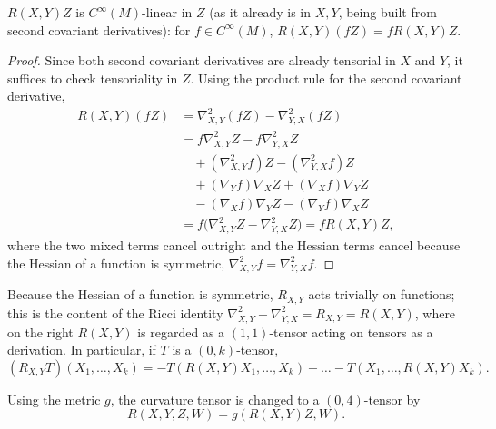 \begin{lemma}
  \label{lem:pet-ch3-curvature-tensor-tensorial}
  \leanok
  $R(X,Y)Z$ is $C^\infty(M)$-linear in $Z$ (as it already is in $X,Y$, being built
  from second covariant derivatives): for $f\in C^\infty(M)$,
  $R(X,Y)(fZ)=fR(X,Y)Z$.
\end{lemma}
\begin{proof}
  \leanok
  Since both second covariant derivatives are already tensorial in $X$ and $Y$, it
  suffices to check tensoriality in $Z$. Using the product rule for the second
  covariant derivative,
  \begin{align*}
    R(X,Y)(fZ)&=\nabla^2_{X,Y}(fZ)-\nabla^2_{Y,X}(fZ)\\
    &=f\nabla^2_{X,Y}Z-f\nabla^2_{Y,X}Z\\
    &\quad+(\nabla^2_{X,Y}f)Z-(\nabla^2_{Y,X}f)Z\\
    &\quad+(\nabla_Yf)\nabla_XZ+(\nabla_Xf)\nabla_YZ\\
    &\quad-(\nabla_Xf)\nabla_YZ-(\nabla_Yf)\nabla_XZ\\
    &=f\big(\nabla^2_{X,Y}Z-\nabla^2_{Y,X}Z\big)=fR(X,Y)Z,
  \end{align*}
  where the two mixed terms cancel outright and the Hessian terms cancel because
  the Hessian of a function is symmetric, $\nabla^2_{X,Y}f=\nabla^2_{Y,X}f$.
\end{proof}

\begin{remark}
  \label{rem:pet-ch3-ricci-identity-derivation}
  \leanok
  Because the Hessian of a function is symmetric, $R_{X,Y}$ acts trivially on
  functions; this is the content of the Ricci identity
  $\nabla^2_{X,Y}-\nabla^2_{Y,X}=R_{X,Y}=R(X,Y)$, where on the right $R(X,Y)$ is
  regarded as a $(1,1)$-tensor acting on tensors as a derivation. In particular, if
  $T$ is a $(0,k)$-tensor,
  \[
    (R_{X,Y}T)(X_1,\dots,X_k)=-T(R(X,Y)X_1,\dots,X_k)-\dots-T(X_1,\dots,R(X,Y)X_k).
  \]
\end{remark}

\begin{definition}
  \label{def:pet-ch3-curvature-04-tensor}
  \leanok
  Using the metric $g$, the curvature tensor is changed to a $(0,4)$-tensor by
  \[
    R(X,Y,Z,W)=g(R(X,Y)Z,W).
  \]
\end{definition}

